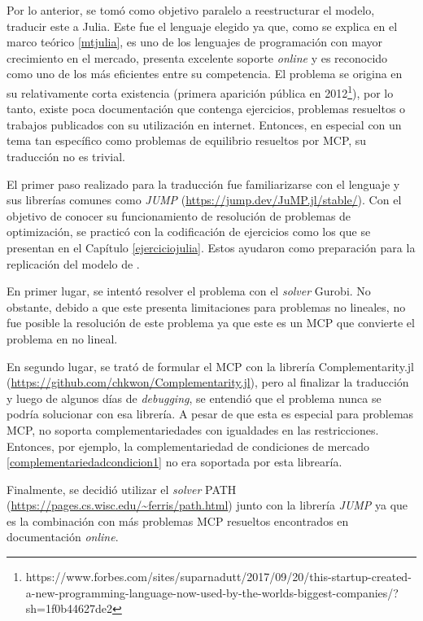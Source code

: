 Por lo anterior, se tomó como objetivo paralelo a reestructurar el modelo, traducir este a Julia. Este fue el lenguaje elegido ya que, como se explica en el marco teórico \ref{mtjulia}, es uno de los lenguajes de programación con mayor crecimiento en el mercado, presenta excelente soporte \textit{online} y es reconocido como uno de los más eficientes entre su competencia. El problema se origina en su relativamente corta existencia (primera aparición pública en 2012\footnote{https://www.forbes.com/sites/suparnadutt/2017/09/20/this-startup-created-a-new-programming-language-now-used-by-the-worlds-biggest-companies/?sh=1f0b44627de2}), por lo tanto, existe poca documentación que contenga ejercicios, problemas resueltos o trabajos publicados con su utilización en internet. Entonces, en especial con un tema tan específico como problemas de equilibrio resueltos por MCP, su traducción no es trivial.
\vspace{2.5mm}

El primer paso realizado para la traducción fue familiarizarse con el lenguaje y sus librerías comunes como \textit{JUMP} (\url{https://jump.dev/JuMP.jl/stable/}). Con el objetivo de conocer su funcionamiento de resolución de problemas de optimización, se practicó con la codificación de ejercicios como los que se presentan en el Capítulo \ref{ejerciciojulia}. Estos ayudaron como preparación para la replicación del modelo de .
\vspace{2.5mm}

En primer lugar, se intentó resolver el problema con el \textit{solver} Gurobi. No obstante, debido a que este presenta limitaciones para problemas no lineales, no fue posible la resolución de este problema ya que este es un MCP que convierte el problema en no lineal.
\vspace{2.5mm}

En segundo lugar, se trató de formular el MCP con la librería Complementarity.jl (\url{https://github.com/chkwon/Complementarity.jl}), pero al finalizar la traducción y luego de algunos días de \textit{debugging}, se entendió que el problema nunca se podría solucionar con esa librería. A pesar de que esta es especial para problemas MCP, no soporta complementariedades con igualdades en las restricciones. Entonces, por ejemplo, la complementariedad de condiciones de mercado \ref{complementariedadcondicion1} no era soportada por esta librearía. 
\vspace{2.5mm}

 Finalmente, se decidió utilizar el \textit{solver} PATH (\url{https://pages.cs.wisc.edu/~ferris/path.html}) junto con la librería \textit{JUMP} ya que es la combinación con más problemas MCP resueltos encontrados en documentación \textit{online}.
 \vspace{2.5mm}
 
